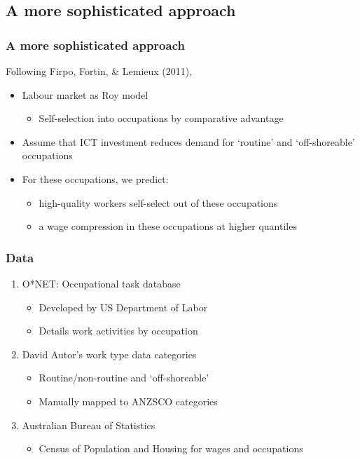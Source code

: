 \documentclass[red]{beamer}
\newcommand{\vitem}{\vfill\item}
\begin{document}
\subsection{A more sophisticated approach}
\begin{frame}
  \frametitle{A more sophisticated approach}
  Following Firpo, Fortin, \& Lemieux (2011),
  \begin{itemize}
  \vitem Labour market as Roy model
    \begin{itemize}
    \item Self-selection into occupations by comparative advantage
    \end{itemize}
  \vitem Assume that ICT investment reduces demand for `routine' and `off-shoreable' occupations
  \vitem For these occupations, we predict:
    \begin{itemize}
    \item high-quality workers self-select out of these occupations
    \item a wage compression in these occupations at higher quantiles
    \end{itemize}
  \end{itemize}
\end{frame}

\begin{frame}
  \frametitle{Data}
  \begin{enumerate}
  \item O*NET: Occupational task database
    \begin{itemize}
    \item Developed by US Department of Labor
    \item Details work activities by occupation
    \end{itemize}
    \vspace{10pt}
  \item David Autor's work type data categories
    \begin{itemize}
    \item Routine/non-routine and `off-shoreable'
    \item Manually mapped to ANZSCO categories
    \end{itemize}
    \vspace{10pt}
  \item Australian Bureau of Statistics
    \begin{itemize}
    \item Census of Population and Housing for wages and occupations
    \end{itemize}
  \end{enumerate}
\end{frame}
\end{document}
